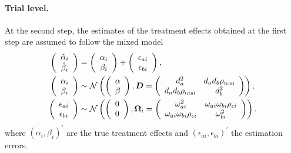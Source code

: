 \documentclass[article,shortnames, nojss]{jss}\usepackage[]{graphicx}\usepackage[]{color}
\begin{document}
\paragraph{Trial level.}
At the second step, the estimates of the treatment effects 
  obtained at the first step are assumed to follow the mixed model
  \begin{align}
    \left(\begin{array}{c} 
      {\hat\alpha_i}\\ {\hat\beta_i}\end{array}\right)
    &= \left(\begin{array}{c} \alpha_i\\ \beta_i\end{array}\right) +
      \left(\begin{array}{c} \epsilon_{ai}\\ \epsilon_{bi}\end{array}\right),
    \\
    \left(\begin{array}{c} {\alpha_i}\\ {\beta_i}\end{array}\right)
    & \sim \mathcal N
      \left(
      \left(\begin{array}{c}
      \alpha\\ \beta\end{array}\right), 
      \bm D = \left(\begin{array}{cc} 
      d_a^2 &
      d_a d_b{\rho_\text{\tiny trial}} \\
      d_a d_b{\rho_\text{\tiny trial}} &
      d_b^2 \\
      \end{array}\right)
      \right),
      \label{eq:trtEffs}
    \\
    \left(\begin{array}{c} \epsilon_{ai}\\ \epsilon_{bi}\end{array}\right)
    &\sim \mathcal N \left(
      \left(\begin{array}{c}0\\0\end{array}\right),
      \bm\Omega_i = \left(\begin{array}{cc} 
            \omega_{ai}^2 &
            \omega_{ai} \omega_{bi} {\rho_{\epsilon i}} \\
            \omega_{ai} \omega_{bi} {\rho_{\epsilon i}} &
            \omega_{bi}^2 \\
        \end{array}\right)\right).
  \end{align}
  where $(\alpha_i, \beta_i)^\prime$ are the true treatment effects
  and $(\epsilon_{ai}, \epsilon_{bi})^\prime$ the estimation errors.
\end{document}
